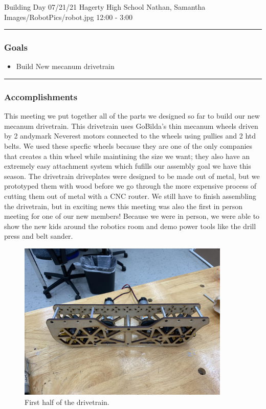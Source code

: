 \insertmeeting 
	{Building Day} 
	{07/21/21}
	{Hagerty High School}
	{Nathan, Samantha}
	{Images/RobotPics/robot.jpg}
	{12:00 - 3:00}
	
\noindent\hfil\rule{\textwidth}{.4pt}\hfil
\subsubsection*{Goals}
\begin{itemize}
    \item Build New mecanum drivetrain   

\end{itemize} 

\noindent\hfil\rule{\textwidth}{.4pt}\hfil

\subsubsection*{Accomplishments}
This meeting we put together all of the parts we designed so far to build our new mecanum drivetrain. This drivetrain uses GoBilda's thin mecanum wheels driven by 2 andymark Neverest motors connected to the wheels using pullies and 2 htd belts. We used these specfic wheels because they are one of the only companies that creates a thin wheel while maintining the size we want; they also have an extremely easy attachment system which fufills our assembly goal we have this season. The drivetrain driveplates were designed to be made out of metal, but we prototyped them with wood before we go through the more expensive process of cutting them out of metal with a CNC router. We still have to finish assembling the drivetrain, but in exciting news this meeting was also the first in person meeting for one of our new members! Because we were in person, we were able to show the new kids around the robotics room and demo power tools like the drill press and belt sander.

\begin{figure}[htp]
\centering
\includegraphics[width=0.9\textwidth, angle=0]{Meetings/July/07-21-21/drivetrain_7-20-21-NathanForrer.jpg}
\caption{First half of the drivetrain.}
\label{fig:072121_1}
\end{figure}

